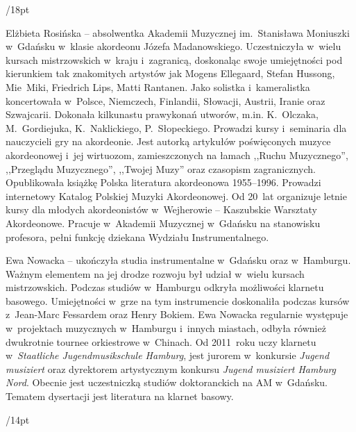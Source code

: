 \documentclass[twoside,a4page]{article}
\newcommand{\opis}[1]{{\fontsize{10pt}{12pt}\sffamily\selectfont  #1} }
\newcommand{\Opis}[1]{\vskip12pt plus 24pt\opis{#1}\par}
\begin{document}
\Opis{12/18pt}
\fontsize{12pt}{17pt}\selectfont

Elżbieta Rosińska – absolwentka Akademii Muzycznej im.~Stanisława
Moniuszki w~Gdańsku w~klasie akordeonu Józefa
Madanowskiego. Uczestniczyła w~wielu kursach mistrzowskich w~kraju
i~zagranicą, doskonaląc swoje umiejętności pod kierunkiem tak
znakomitych artystów jak Mogens Ellegaard, Stefan Hussong, Mie~Miki,
Friedrich Lips, Matti Rantanen. Jako solistka i~kameralistka
koncertowała w~Polsce, Niemczech, Finlandii, Słowacji, Austrii,
Iranie oraz Szwajcarii. Dokonała kilkunastu prawykonań utworów, m.in.
K.~Olczaka, M.~Gordiejuka, K.~Naklickiego, P.~Słopeckiego. Prowadzi kursy
i~seminaria dla nauczycieli gry na akordeonie. Jest autorką artykułów
poświęconych muzyce akordeonowej i~jej wirtuozom, zamieszczonych na
łamach ,,Ruchu Muzycznego'', ,,Przeglądu Muzycznego'', ,,Twojej Muzy''
oraz czasopism zagranicznych. Opublikowała książkę Polska literatura
akordeonowa 1955–1996. Prowadzi internetowy Katalog Polskiej Muzyki
Akordeonowej. Od 20~lat organizuje letnie kursy dla młodych
akordeonistów w~Wejherowie – Kaszubskie Warsztaty Akordeonowe. Pracuje
w~Akademii Muzycznej w~Gdańsku na stanowisku profesora, pełni funkcję
dziekana Wydziału Instrumentalnego.


Ewa Nowacka – ukończyła studia instrumentalne w~Gdańsku oraz
w~Hamburgu. Ważnym elementem na jej drodze rozwoju był udział w~wielu
kursach mistrzowskich. Podczas studiów w~Hamburgu odkryła możliwości
klarnetu basowego.  Umiejętności w~grze na tym instrumencie
doskonaliła podczas kursów z~Jean-Marc Fessardem oraz Henry
Bokiem. Ewa Nowacka regularnie występuje w~projektach muzycznych
w~Hamburgu i~innych miastach, odbyła również dwukrotnie tournee
orkiestrowe w~Chinach. Od 2011~roku uczy klarnetu w~\emph{Staatliche
Jugendmusikschule Hamburg}, jest jurorem w~konkursie \emph{Jugend musiziert\/}
oraz dyrektorem artystycznym konkursu \emph{Jugend musiziert Hamburg
  Nord}. Obecnie jest uczestniczką studiów doktoranckich na AM
w~Gdańsku. Tematem dysertacji jest literatura na klarnet basowy.

\Opis{10/14pt}
\fontsize{10pt}{14pt}\selectfont
\end{document}
